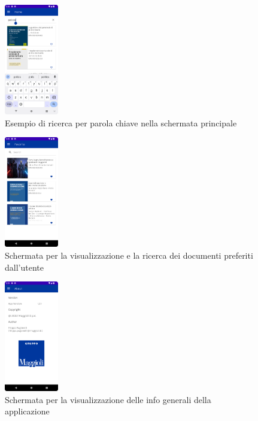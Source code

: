 \begin{multicols}{3}
            \begin{figure}[H]
                \includegraphics[width=0.21\textwidth]{img/ricerca.png}
                \caption{Esempio di ricerca per parola chiave nella schermata principale}
                \label{ricerca}
            \end{figure}

            \begin{figure}[H]
                \includegraphics[width=0.21\textwidth]{img/preferiti.png}
                \caption{Schermata per la visualizzazione e la ricerca dei documenti preferiti dall'utente}
                \label{preferiti}
            \end{figure}

            \begin{figure}[H]
                \includegraphics[width=0.21\textwidth]{img/about.png}
                \caption{Schermata per la visualizzazione delle info generali della applicazione}
                \label{about}
            \end{figure}


\end{multicols}

